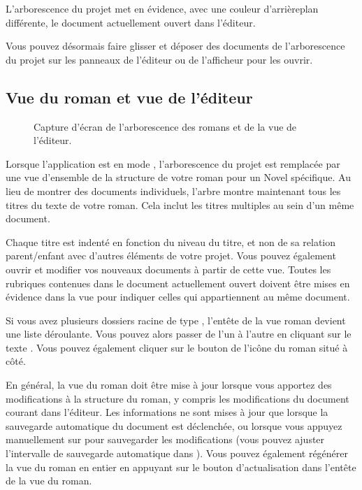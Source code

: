 \documentclass[a4paper,11pt,french]{sphinxmanual}
\begin{document}
\sphinxAtStartPar
L’arborescence du projet met en évidence, avec une couleur d’arrière\sphinxhyphen{}plan différente, le document actuellement ouvert dans l’éditeur.

\sphinxAtStartPar
{}Vous pouvez désormais faire glisser et déposer des documents de l’arborescence du projet sur les panneaux de l’éditeur ou de l’afficheur pour les ouvrir.


\subsection{Vue du roman et vue de l’éditeur}
\label{\detokenize{usage_breakdown:novel-view-and-editor-view}}
\begin{figure}[htbp]
\centering
\capstart

\noindent{}
\caption{Capture d’écran de l’arborescence des romans et de la vue de l’éditeur.}\label{\detokenize{usage_breakdown:id2}}\end{figure}

\sphinxAtStartPar
Lorsque l’application est en mode , l’arborescence du projet est remplacée par une vue d’ensemble de la structure de votre roman pour un Novel {\hyperref[\detokenize{int_glossary:term-Root-Folder}]{}} spécifique. Au lieu de montrer des documents individuels, l’arbre montre maintenant tous les titres du texte de votre roman. Cela inclut les titres multiples au sein d’un même document.

\sphinxAtStartPar
Chaque titre est indenté en fonction du niveau du titre, et non de sa relation parent/enfant avec d’autres éléments de votre projet. Vous pouvez également ouvrir et modifier vos nouveaux documents à partir de cette vue. Toutes les rubriques contenues dans le document actuellement ouvert doivent être mises en évidence dans la vue pour indiquer celles qui appartiennent au même document.

\sphinxAtStartPar
Si vous avez plusieurs dossiers racine de type , l’en\sphinxhyphen{}tête de la vue roman devient une liste déroulante. Vous pouvez alors passer de l’un à l’autre en cliquant sur le texte . Vous pouvez également cliquer sur le bouton de l’icône du roman situé à côté.

\sphinxAtStartPar
En général, la vue du roman doit être mise à jour lorsque vous apportez des modifications à la structure du roman, y compris les modifications du document courant dans l’éditeur. Les informations ne sont mises à jour que lorsque la sauvegarde automatique du document est déclenchée, ou lorsque vous appuyez manuellement sur  pour sauvegarder les modifications (vous pouvez ajuster l’intervalle de sauvegarde automatique dans ). Vous pouvez également régénérer la vue du roman en entier en appuyant sur le bouton d’actualisation dans l’en\sphinxhyphen{}tête de la vue du roman.
\end{document}
